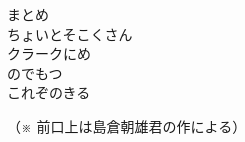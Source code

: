 \documentclass[10pt,b5j]{tarticle} %
\begin{document}
\begin{enumerate}
\begin{minipage}[c]{\blocksize}
    \end{minipage}
    \begin{minipage}[c]{\blocksize}

        \vspace{\linespace}
        \item[まとめ]~\\
        ちょいとそこくさん\\
        クラークにめ\\
        のでもつ\\
        これぞのきる
    
    \end{minipage}
\end{enumerate} %

\begin{flushright}
    （※ 前口上は島倉朝雄君の作による）
\end{flushright}

\end{document}
